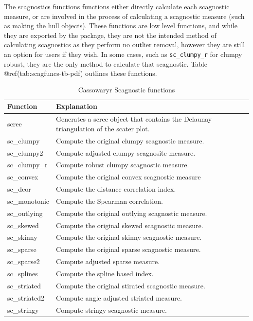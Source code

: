 The scagnostics functions functions either directly calculate each
scagnostic measure, or are involved in the process of calculating a
scagnostic measure (such as making the hull objects). These functions
are low level functions, and while they are exported by the package,
they are not the intended method of calculating scagnostics as they
perform no outlier removal, however they are still an option for users
if they wish. In some cases, such as \texttt{sc\_clumpy\_r} for clumpy
robust, they are the only method to calculate that scagnostic. Table
@ref(tab:scagfuncs-tb-pdf) outlines these functions.

\begin{Schunk}
\begin{table}

\caption{\label{tab:scagfuncs-tb-pdf}Cassowaryr Scagnostic functions}
\centering
\begin{tabular}[t]{>{\raggedright\arraybackslash}p{3cm}>{\raggedright\arraybackslash}p{10cm}}
\toprule
Function & Explanation\\
\midrule
scree & Generates a scree object that contains the Delaunay triangulation of the scater plot.\\
sc\_clumpy & Compute the original clumpy scagnostic measure.\\
sc\_clumpy2 & Compute adjusted clumpy scagnositc measure.\\
sc\_clumpy\_r & Compute robust clumpy scagnostic measure.\\
sc\_convex & Compute the original convex scagnostic measure\\
\addlinespace
sc\_dcor & Compute the distance correlation index.\\
sc\_monotonic & Compute the Spearman correlation.\\
sc\_outlying & Compute the original outlying scagnostic measure.\\
sc\_skewed & Compute the original skewed scagnostic measure.\\
sc\_skinny & Compute the original skinny scagnostic measure.\\
\addlinespace
sc\_sparse & Compute the original sparse scagnostic measure.\\
sc\_sparse2 & Compute adjusted sparse measure.\\
sc\_splines & Compute the spline based index.\\
sc\_striated & Compute the original stirated scagnostic measure.\\
sc\_striated2 & Compute angle adjusted striated measure.\\
\addlinespace
sc\_stringy & Compute stringy scagnostic measure.\\
\bottomrule
\end{tabular}
\end{table}

\end{Schunk}

